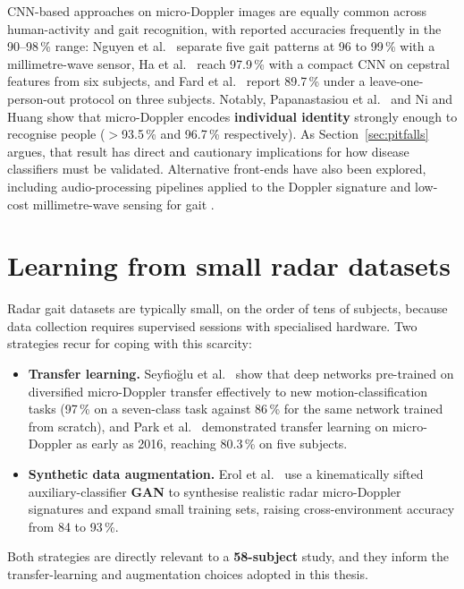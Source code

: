 CNN-based approaches on micro-Doppler images are equally common across
human-activity and gait recognition, with reported accuracies frequently in
the 90--98\,\% range: Nguyen et al.\ \cite{nguyen2024} separate five gait
patterns at 96 to 99\,\% with a millimetre-wave sensor, Ha et al.\
\cite{ha2023} reach 97.9\,\% with a compact CNN on cepstral features from six
subjects, and Fard et al.\ \cite{fard2026} report 89.7\,\% under a
leave-one-person-out protocol on three subjects. Notably, Papanastasiou et
al.\ \cite{papanastasiou2020} and Ni and Huang \cite{ni2020} show that
micro-Doppler encodes \textbf{individual identity} strongly enough to recognise
people ($>$93.5\,\% and 96.7\,\% respectively). As Section~\ref{sec:pitfalls}
argues, that result has direct and cautionary implications for how disease
classifiers must be validated. Alternative front-ends have also been explored,
including audio-processing pipelines applied to the Doppler signature
\cite{ha2023} and low-cost millimetre-wave sensing for gait \cite{alanazi2022}.

\section{Learning from small radar datasets}
\label{sec:small}

Radar gait datasets are typically small, on the order of tens of subjects,
because data collection requires supervised sessions with specialised hardware.
Two strategies recur for coping with this scarcity:

\begin{itemize}
  \item \textbf{Transfer learning.} Seyfio\u{g}lu et al.\ \cite{seyfioglu2018}
        show that deep networks pre-trained on diversified micro-Doppler transfer
        effectively to new motion-classification tasks (97\,\% on a
        seven-class task against 86\,\% for the same network trained from
        scratch), and Park et al.\ \cite{park2016} demonstrated transfer
        learning on micro-Doppler as early as 2016, reaching 80.3\,\% on five
        subjects.
  \item \textbf{Synthetic data augmentation.} Erol et al.\ \cite{erol2020} use a
        kinematically sifted auxiliary-classifier \textbf{GAN} to synthesise
        realistic radar micro-Doppler signatures and expand small training sets,
        raising cross-environment accuracy from 84 to 93\,\%.
\end{itemize}

Both strategies are directly relevant to a \textbf{58-subject} study, and they
inform the transfer-learning and augmentation choices adopted in this thesis.

